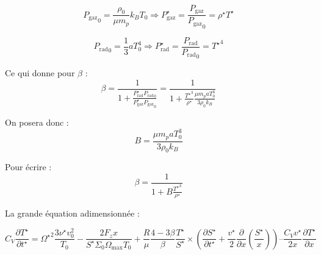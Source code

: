 \begin{equation}
    {P_\mathrm{gaz}}_0 = \frac{\rho_0}{\mu m_p} k_B T_0 \Rightarrow P_\mathrm{gaz}^\star = \frac{P_\mathrm{gaz}}{{P_\mathrm{gaz}}_0} = \rho^\star T^\star
\end{equation}

\begin{equation}
    {P_\mathrm{rad}}_0 = \frac{1}{3} a T_0^4 \Rightarrow P_\mathrm{rad}^\star = \frac{P_\mathrm{rad}}{{P_\mathrm{rad}}_0} = {T^\star}^4
\end{equation}

Ce qui donne pour $\beta$ :
\begin{equation}
    \beta = \frac{1}{1 + \frac{P_\mathrm{rad}^\star {P_\mathrm{rad}}_0}{P_\mathrm{gaz}^\star {P_\mathrm{gaz}}_0}} = \frac{1}{1 + \frac{{T^\star}^3}{\rho^\star} \frac{\mu m_p a T_0^3}{3 \rho_0 k_B}}
\end{equation}

On posera donc :
\begin{equation}
    B = \frac{\mu m_p a T_0^3}{3 \rho_0 k_B}
\end{equation}

Pour écrire :
\begin{equation}
    \beta = \frac{1}{1 + B \frac{{T^\star}^3}{\rho^\star}}
\end{equation}

La grande équation adimensionnée :

\begin{equation}
    C_V \frac{\partial T^{\star}}{\partial t^{\star}} =
    {\Omega^\star}^2 \frac{3 \nu^\star v_0^2}{T_0} - \frac{2 F_z x}{S^\star \Sigma_0 \Omega_\mathrm{max} T_0} +
    \frac{R}{\mu} \frac{4-3\beta}{\beta} \frac{T^\star}{S^\star} ×
    \left( \frac{\partial S^\star}{\partial t^\star} + \frac{v^\star}{2} \frac{\partial}{\partial x} \left(\frac{S^\star}{x}\right) \right) –
    \frac{C_V v^\star}{2 x} \frac{\partial T^\star}{\partial x}
\end{equation}

